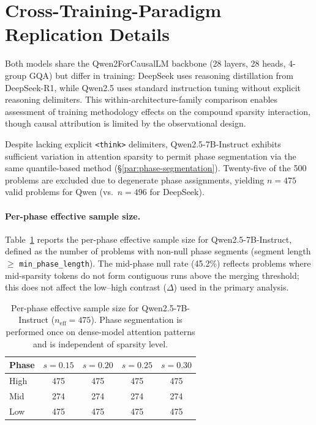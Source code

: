\section{Cross-Training-Paradigm Replication Details}
\label{app:cross-model-details}

Both models share the Qwen2ForCausalLM backbone (28 layers, 28 heads, 4-group GQA) but differ in training: DeepSeek uses reasoning distillation from DeepSeek-R1, while Qwen2.5 uses standard instruction tuning without explicit reasoning delimiters. This within-architecture-family comparison enables assessment of training methodology effects on the compound sparsity interaction, though causal attribution is limited by the observational design.

Despite lacking explicit \texttt{<think>} delimiters, Qwen2.5-7B-Instruct exhibits sufficient variation in attention sparsity to permit phase segmentation via the same quantile-based method (\S\ref{par:phase-segmentation}). Twenty-five of the 500 problems are excluded due to degenerate phase assignments, yielding $n{=}475$ valid problems for Qwen (vs.\ $n{=}496$ for DeepSeek).

\paragraph{Per-phase effective sample size.}
\label{app:qwen-null-rate}
Table~\ref{tab:qwen-effective-n} reports the per-phase effective sample size for Qwen2.5-7B-Instruct, defined as the number of problems with non-null phase segments (segment length $\geq$ \texttt{min\_phase\_length}). The mid-phase null rate (45.2\%) reflects problems where mid-sparsity tokens do not form contiguous runs above the merging threshold; this does not affect the low--high contrast ($\Delta$) used in the primary analysis.

\begin{table}[t]
\centering
\small
\caption{Per-phase effective sample size for Qwen2.5-7B-Instruct ($n_{\text{eff}} = 475$). Phase segmentation is performed once on dense-model attention patterns and is independent of sparsity level.}
\label{tab:qwen-effective-n}
\begin{tabular}{@{}lcccc@{}}
\toprule
Phase & $s{=}0.15$ & $s{=}0.20$ & $s{=}0.25$ & $s{=}0.30$ \\
\midrule
High & 475 & 475 & 475 & 475 \\
Mid  & 274 & 274 & 274 & 274 \\
Low  & 475 & 475 & 475 & 475 \\
\bottomrule
\end{tabular}
\end{table}

